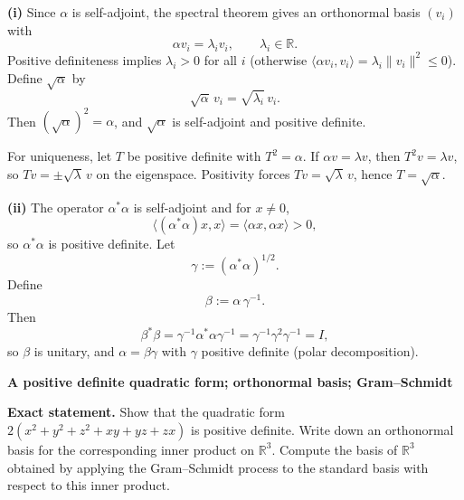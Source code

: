 \begin{solution}
\textbf{(i)} Since $\alpha$ is self-adjoint, the spectral theorem gives an orthonormal basis $(v_i)$ with
\[
\alpha v_i=\lambda_i v_i,\qquad \lambda_i\in\mathbb R.
\]
Positive definiteness implies $\lambda_i>0$ for all $i$ (otherwise $\langle \alpha v_i,v_i\rangle=\lambda_i\|v_i\|^2\le 0$).
Define $\sqrt{\alpha}$ by
\[
\sqrt{\alpha}\,v_i=\sqrt{\lambda_i}\,v_i.
\]
Then $(\sqrt{\alpha})^2=\alpha$, and $\sqrt{\alpha}$ is self-adjoint and positive definite.

For uniqueness, let $T$ be positive definite with $T^2=\alpha$.
If $\alpha v=\lambda v$, then $T^2v=\lambda v$, so $Tv=\pm\sqrt{\lambda}\,v$ on the eigenspace.
Positivity forces $Tv=\sqrt{\lambda}\,v$, hence $T=\sqrt{\alpha}$.

\textbf{(ii)} The operator $\alpha^*\alpha$ is self-adjoint and for $x\neq 0$,
\[
\langle (\alpha^*\alpha)x,x\rangle=\langle \alpha x,\alpha x\rangle>0,
\]
so $\alpha^*\alpha$ is positive definite. Let
\[
\gamma:=(\alpha^*\alpha)^{1/2}.
\]
Define
\[
\beta:=\alpha\,\gamma^{-1}.
\]
Then
\[
\beta^*\beta=\gamma^{-1}\alpha^*\alpha\gamma^{-1}=\gamma^{-1}\gamma^2\gamma^{-1}=I,
\]
so $\beta$ is unitary, and $\alpha=\beta\gamma$ with $\gamma$ positive definite (polar decomposition).
\end{solution}

\begin{problem}[CP-I-0106]
\label{prob:cp-i-0106}
\textbf{A positive definite quadratic form; orthonormal basis; Gram--Schmidt}

\textbf{Exact statement.}
\hspace*{1.5em}Show that the quadratic form $2(x^2+y^2+z^2+xy+yz+zx)$ is positive definite.
Write down an orthonormal basis for the corresponding inner product on $\mathbb R^3$.
Compute the basis of $\mathbb R^3$ obtained by applying the Gram--Schmidt process to the standard basis with respect to this inner product.

\end{problem}

